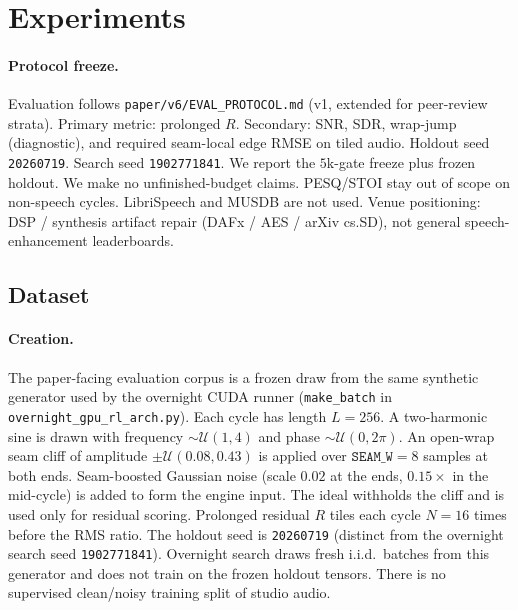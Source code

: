 \section{Experiments}
\label{sec:experiments}

\paragraph{Protocol freeze.}
Evaluation follows \texttt{paper/v6/EVAL\_PROTOCOL.md} (v1, extended for peer-review strata).
Primary metric: prolonged $R$. Secondary: SNR, SDR, wrap-jump (diagnostic), and required seam-local edge RMSE on tiled audio.
Holdout seed \texttt{20260719}. Search seed \texttt{1902771841}.
We report the $5$k-gate freeze plus frozen holdout. We make no unfinished-budget claims. PESQ/STOI stay out of scope on non-speech cycles.
LibriSpeech and MUSDB are not used.
Venue positioning: DSP / synthesis artifact repair (DAFx / AES / arXiv cs.SD), not general speech-enhancement leaderboards.

\subsection{Dataset}
\label{sec:dataset}

\paragraph{Creation.}
The paper-facing evaluation corpus is a frozen draw from the same synthetic generator used by the overnight CUDA runner (\texttt{make\_batch} in \texttt{overnight\_gpu\_rl\_arch.py}).
Each cycle has length $L{=}256$.
A two-harmonic sine is drawn with frequency $\sim\mathcal{U}(1,4)$ and phase $\sim\mathcal{U}(0,2\pi)$.
An open-wrap seam cliff of amplitude $\pm\mathcal{U}(0.08,0.43)$ is applied over $\texttt{SEAM\_W}{=}8$ samples at both ends.
Seam-boosted Gaussian noise (scale $0.02$ at the ends, $0.15\times$ in the mid-cycle) is added to form the engine input.
The ideal withholds the cliff and is used only for residual scoring.
Prolonged residual $R$ tiles each cycle $N{=}16$ times before the RMS ratio.
The holdout seed is \texttt{20260719} (distinct from the overnight search seed \texttt{1902771841}).
Overnight search draws fresh i.i.d.\ batches from this generator and does not train on the frozen holdout tensors.
There is no supervised clean/noisy training split of studio audio.

